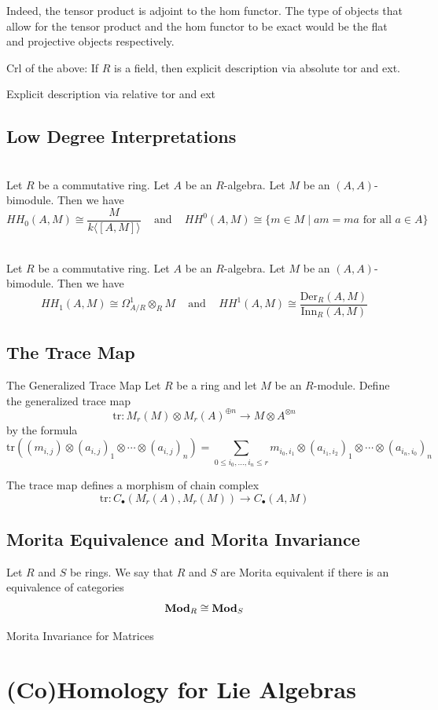 \documentclass[a4paper]{article}
\begin{document}
Indeed, the tensor product is adjoint to the hom functor. The type of objects that allow for the tensor product and the hom functor to be exact would be the flat and projective objects respectively. 

Crl of the above: If $R$ is a field, then explicit description via absolute tor and ext. 

Explicit description via relative tor and ext

\subsection{Low Degree Interpretations}
\begin{prp}{}{}\\
Let $R$ be a commutative ring. Let $A$ be an $R$-algebra. Let $M$ be an $(A,A)$-bimodule. Then we have $$HH_0(A,M)\cong\frac{M}{k\langle[A,M]\rangle}\;\;\;\text{ and }\;\;\;HH^0(A,M)\cong\{m\in M\;|\;am=ma\text{ for all }a\in A\}$$
\end{prp}

\begin{prp}{}{}\\
Let $R$ be a commutative ring. Let $A$ be an $R$-algebra. Let $M$ be an $(A,A)$-bimodule. Then we have $$HH_1(A,M)\cong\Omega_{A/R}^1\otimes_RM\;\;\;\text{ and }\;\;\;HH^1(A,M)\cong\frac{\text{Der}_R(A,M)}{\text{Inn}_R(A,M)}$$
\end{prp}

\subsection{The Trace Map}
\begin{defn}{The Generalized Trace Map}{} Let $R$ be a ring and let $M$ be an $R$-module. Define the generalized trace map $$\text{tr}:M_r(M)\otimes M_r(A)^{\oplus n}\to M\otimes A^{\otimes n}$$ by the formula $$\text{tr}((m_{i,j})\otimes (a_{i,j})_1\otimes\cdots\otimes(a_{i,j})_n)=\sum_{0\leq i_0,\dots,i_n\leq r}m_{i_0,i_1}\otimes (a_{i_1,i_2})_1\otimes\cdots\otimes (a_{i_n,i_0})_n$$
\end{defn}

\begin{thm}{}{} The trace map defines a morphism of chain complex $$\text{tr}:C_\bullet(M_r(A),M_r(M))\to C_\bullet(A,M)$$
\end{thm}

\subsection{Morita Equivalence and Morita Invariance}
\begin{defn}{}{} Let $R$ and $S$ be rings. We say that $R$ and $S$ are Morita equivalent if there is an equivalence of categories $$\bold{Mod}_R\cong\bold{Mod}_S$$
\end{defn}

\begin{thm}{Morita Invariance for Matrices}{}
\end{thm}

\pagebreak
\section{(Co)Homology for Lie Algebras}
\end{document}
